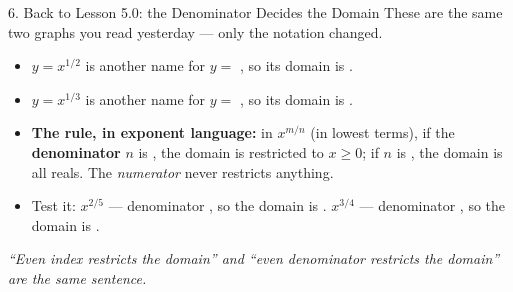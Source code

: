 \documentclass[10pt]{article}
\newcommand{\lgrid}[4]{%
  \draw[step=1, linegray!40, very thin] (#1,#3) grid (#2,#4);
  \draw[->, semithick, charcoal] (#1,0)--(#2,0) node[below right, font=\scriptsize]{$x$};
  \draw[->, semithick, charcoal] (0,#3)--(0,#4) node[left, font=\scriptsize]{$y$};}
\newcommand{\cbrtpos}[2]{\draw[very thick, forest, domain=#1:#2, samples=70, smooth]
  plot (\x,{pow(\x,1/3)});}
\newcommand{\cbrtneg}[2]{\draw[very thick, forest, domain=#1:#2, samples=70, smooth]
  plot (\x,{-pow(-1*(\x),1/3)});}
\begin{document}
\begin{notesbox}{6. Back to Lesson 5.0: the Denominator Decides the Domain}
These are the same two graphs you read yesterday --- only the notation changed.
\begin{center}
\end{center}
\begin{itemize}[leftmargin=1.5em, itemsep=3pt]
  \item $y=x^{1/2}$ is another name for $y=$ , so its domain is \ans{$[0,\infty)$}.
  \item $y=x^{1/3}$ is another name for $y=$ , so its domain is .
  \item \textbf{The rule, in exponent language:} in $x^{m/n}$ (in lowest terms), if the
        \textbf{denominator} $n$ is , the domain is restricted to $x\ge 0$;
        if $n$ is , the domain is all reals. The \emph{numerator} never restricts
        anything.
  \item Test it: $x^{2/5}$ --- denominator , so the domain is . \quad
        $x^{3/4}$ --- denominator , so the domain is \ans{$[0,\infty)$}.
\end{itemize}
\emph{``Even index restricts the domain'' and ``even denominator restricts the domain'' are the same
sentence.}
\end{notesbox}
\end{document}
